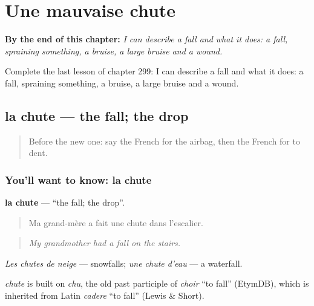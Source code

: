 
\chapter{Une mauvaise chute}
\label{ch:fr-une-mauvaise-chute}

\begin{chapteropening}
\textbf{By the end of this chapter:} \emph{I can describe a fall and what it does: a fall, spraining something, a bruise, a large bruise and a wound.}

Complete the last lesson of chapter 299: I can describe a fall and what it does: a fall, spraining something, a bruise, a large bruise and a wound.
\end{chapteropening}

\section[la chute]{la chute — the fall; the drop}

\label{lesson:FR-C299-chute}



\begin{quote}
Before the new one: say the French for the airbag, then the French for to dent.
\end{quote}

\subsection*{You'll want to know: la chute}
\textbf{la chute} — \textquotedblleft{}the fall; the drop\textquotedblright{}.

\begin{quote}
Ma grand-mère a fait une chute dans l'escalier.
\end{quote}

\begin{quote}
\emph{My grandmother had a fall on the stairs.}
\end{quote}

\emph{Les chutes de neige} — snowfalls; \emph{une chute d'eau} — a waterfall.

\begin{cousinweb}
\emph{chute} is built on \emph{chu}, the old past participle of \emph{choir} \textquotedblleft{}to fall\textquotedblright{} (EtymDB), which is inherited from Latin \emph{cadere} \textquotedblleft{}to fall\textquotedblright{} (Lewis \& Short).
\end{cousinweb}

